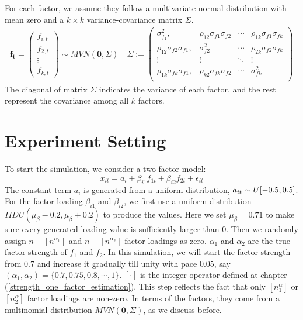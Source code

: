  For each factor, we assume they follow a multivariate normal distribution with mean zero and a $k\times k$ variance-covariance matrix $\Sigma$. 
\begin{align*}
\bm{f_t} = \begin{pmatrix}
f_{i,t}\\f_{2,t}\\\vdots\\f_{k,t}
\end{pmatrix} \sim MVN(\bm{0}, \Sigma) \quad
 \Sigma := 
\begin{pmatrix}
\sigma^2_{f_1}, & \rho_{12}\sigma_{f1}\sigma_{f2} &\cdots  & \rho_{1k}\sigma_{f1}\sigma_{fk}\\
\rho_{12}\sigma_{f2}\sigma_{f1}, & \sigma^2_{f2} &\cdots  & \rho_{2k}\sigma_{f2}\sigma_{fk}\\
\vdots & \vdots & \ddots & \vdots \\
\rho_{1k}\sigma_{fk}\sigma_{f1}, & \rho_{k2}\sigma_{fk}\sigma_{f2} &\cdots  & \sigma^2_{fk}\\
\end{pmatrix}
\end{align*}
The diagonal of matrix $\Sigma$ indicates the variance of each factor, and the rest represent the covariance among all $k$ factors.


	\section{Experiment Setting}\label{exp_set}
To start the simulation, we consider a two-factor model:
\[    x_{it} = a_{i} + \beta_{i1}f_{1t} + \beta_{i2}f_{2t}+\epsilon_{it} \tag{8} \label{two_factor}   \]
The constant term $a_{i}$ is generated from a uniform distribution, $a_{it} \sim \mathnormal{U}[-0.5,0.5]$.
For the factor loading $\beta_{i1}$ and $\beta_{i2}$, we first use a uniform distribution $IIDU(\mu_{\beta} - 0.2, \mu_{\beta}+0.2)$ to produce the values.
Here we set $\mu_{\beta}=0.71$ to make sure every generated loading value is sufficiently larger than 0.
Then we randomly assign $n - [n^{\alpha_{1}}]$ and $n - [n^{\alpha_{2}}]$ factor loadings as zero.
$\alpha_1$ and $\alpha_2$ are the true factor strength of $f_1$ and $f_2$. 
In this simulation, we will start the factor strength from 0.7 and increase it gradually till unity with pace 0.05, say $(\alpha_{1}, \alpha_{2}) = \{0.7, 0.75,0.8,\cdots,1\}$.
 $[\cdot]$ is the integer operator defined at chapter (\ref{strength_one_factor_estimation}).
This step reflects the fact that only $[n^\alpha_1]$ or $[n^\alpha_2]$ factor loadings are non-zero.
In terms of the factors, they come from a multinomial distribution $MVN(\bm{0}, \Sigma) $, as we discuss before.


